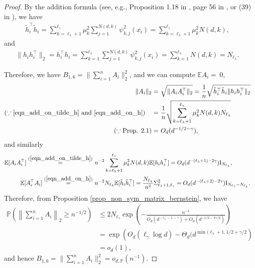 \documentclass{article}
\theoremstyle{plain}
\theoremstyle{definition}
\theoremstyle{remark}
\begin{document}
\begin{appendix}
\begin{proof}
    By the addition formula (see, e.g., Proposition 1.18 in \cite{gallier2009notes}, page 56 in \cite{ghorbani2021linearized}, or (39) in \cite{lu2024pinsker}), we have
    \begin{equation}\label{eqn_add_on_tilde_h}
    \begin{aligned}
        \tilde{h}_i^{\top} \tilde{h}_i =  \sum_{k=\ell_{\lambda}+1}^{\ell_{\gamma}} \mu_k^2 \sum_{j=1}^{N(d, k)} \psi_{k, j}^2(x_i)
        = \sum_{k=\ell_{\lambda}+1}^{\ell_{\gamma}} \mu_k^2 N(d, k),
    \end{aligned}
    \end{equation}
    and
    \begin{equation}\label{eqn_add_on_h}
    \begin{aligned}
        \|h_i h_i^{\top}\|_{2} = h_i^{\top} h_i = \sum_{k=1}^{\ell_{\lambda}} \sum_{j=1}^{N(d, k)} \psi_{k, j}^2(x_i)
        = \sum_{k=1}^{\ell_{\lambda}} N(d, k) = N_{\ell_{\lambda}}.
    \end{aligned}
    \end{equation}

Therefore, we have $B_{1, 6} = \|\sum\nolimits_{i=1}^{n}A_i\|_{2}^{2}$, and we can compute $\mathbb{E}A_i =~ 0$, 
\begin{align*}
    \|A_i\|_{2} =&~ \sqrt{\|A_i A_i^{\top}\|_{2}} = \frac{1}{n}\sqrt{\tilde{h}_i^{\top}\tilde{h}_i \|h_i h_i^{\top}\|_{2}}\\
   (\because \eqref{eqn_add_on_tilde_h} \text{ and } \eqref{eqn_add_on_h})\quad =  &~ \frac{1}{n}\sqrt{\sum_{k=\ell_{\lambda}+1}^{\ell_{\gamma}} \mu_k^2 N(d, k) N_{\ell_{\lambda}}}\\
(\because \text{Prop. 2.1})   =  &~ O_d(d^{-1 / 2 - \gamma}),\\
\end{align*}
and similarly
\begin{align*}
\mathbb{E}[A_i A_i^{\top}] \overset{(\ref{eqn_add_on_tilde_h})}{=}&~ 
    n^{-2} \sum_{k=\ell_{\lambda}+1}^{\ell_{\gamma}} \mu_k^2 N(d, k)\mathbb{E} [h_i h_i^{\top}]=
    O_d(d^{-(\ell_\lambda +1)-2\gamma}) \mathrm{I}_{N_{\ell_\lambda}},\\
    \mathbb{E} [A_i^{\top} A_i] \overset{(\ref{eqn_add_on_h})}{=}&~ 
    n^{-2} N_{\ell_{\lambda}} \mathbb{E} [\tilde{h}_i \tilde{h}_i^{\top}] = \frac{N_{\ell_\lambda}}{n^2}\Sigma_{\ell_{\lambda}+1, \ell_{\gamma}}^2=O_d(d^{- (\ell_{\lambda}+2) - 2\gamma}) \mathrm{I}_{N_{\ell_{\gamma}}-N_{\ell_\lambda}}.
\end{align*}
\color{black}
Therefore, from Proposition \ref{prop_non_sym_matrix_bernstein}, we have
\begin{align*}
\mathbb{P}\left(\left\|\sum_{i=1}^n A_i\right\|_2 \geq n^{-1/2} \right) & \leq 2N_{\ell_{\gamma}} \exp\left(-\frac{n^{-1}}{O_d(d^{-\ell_\lambda -1-\gamma}) + O_d(d^{-1/2-3\gamma / 2})}\right) \\
&=\exp \left( O_d(\ell_{\gamma} \log d) - \Theta_d (d^{\min(\ell_\lambda+1, 1/2+\gamma/2} \right) \\
&= o_d(1),
\end{align*}
and hence $B_{1, 6} = \|\sum\nolimits_{i=1}^{n}A_i\|_{2}^{2} = o_{d, \mathbb{P}}(n^{-1})$.



\end{proof}
\end{appendix}
\end{document}
